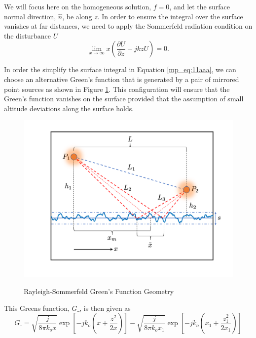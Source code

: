We will focus here on the homogeneous solution, $f=0$, and let the surface normal direction, $\hat{n}$, be along $z$. In order to ensure the integral over the surface vanishes at far distances, we need to apply the Sommerfeld radiation condition on the disturbance $U$
\begin{equation}
 \lim_{x\to\infty} x\left(\frac{\partial U}{\partial z} -jkzU \right) = 0.
\label{mp_eq:11aaaa}
\end{equation}
\renewcommand{\baselinestretch}{2} \small\normalsize

In order the simplify the surface integral in Equation \ref{mp_eq:11aaa}, we can choose an alternative Green's function that is generated by a pair of mirrored point sources as shown in Figure \ref{mp_fig:2a}. This configuration will ensure that the Green's function vanishes on the surface provided that the assumption of small altitude deviations along the surface holds.

\begin{figure}[H]
  \begin{center}
\includegraphics[width=5in]{../media/analysis/multipath_layout.png}
  \end{center}
  \renewcommand{\baselinestretch}{1} \small\normalsize
  \begin{quote}
    \caption[Rayleigh-Sommerfeld Green's Function Geometry]{Rayleigh-Sommerfeld Green's Function Geometry\label{mp_fig:2a}}
  \end{quote}
\end{figure}
\renewcommand{\baselinestretch}{2} \small\normalsize

This Greens function, $G\_$, is then given as
\begin{equation}
G\_= \sqrt{\frac{j}{8\pi k_ox}}\exp\left[-jk_o\left(x + \frac{z^2}{2x}\right) \right] - \sqrt{\frac{j}{8\pi k_ox_1}}\exp\left[-jk_o\left(x_1 + \frac{z_1^2}{2x_1}\right) \right]
\label{mp_eq:11aab}
\end{equation}
\renewcommand{\baselinestretch}{2} \small\normalsize

